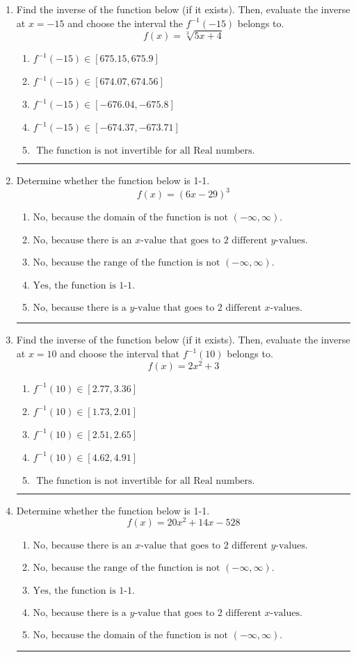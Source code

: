 \documentclass[14pt]{extbook}
\newcommand{\litem}[1]{\item#1\hspace*{-1cm}\rule{\textwidth}{0.4pt}}
\begin{document}
\begin{enumerate}
{\begin{enumerate}[label=\Alph*.]
\end{enumerate} }
\litem{
Find the inverse of the function below (if it exists). Then, evaluate the inverse at $x = -15$ and choose the interval the $f^{-1}(-15)$ belongs to.\[ f(x) = \sqrt[3]{5 x + 4} \]\begin{enumerate}[label=\Alph*.]
\item \( f^{-1}(-15) \in [675.15, 675.9] \)
\item \( f^{-1}(-15) \in [674.07, 674.56] \)
\item \( f^{-1}(-15) \in [-676.04, -675.8] \)
\item \( f^{-1}(-15) \in [-674.37, -673.71] \)
\item \( \text{ The function is not invertible for all Real numbers. } \)

\end{enumerate} }
\litem{
Determine whether the function below is 1-1.\[ f(x) = (6 x - 29)^3 \]\begin{enumerate}[label=\Alph*.]
\item \( \text{No, because the domain of the function is not $(-\infty, \infty)$.} \)
\item \( \text{No, because there is an $x$-value that goes to 2 different $y$-values.} \)
\item \( \text{No, because the range of the function is not $(-\infty, \infty)$.} \)
\item \( \text{Yes, the function is 1-1.} \)
\item \( \text{No, because there is a $y$-value that goes to 2 different $x$-values.} \)

\end{enumerate} }
\litem{
Find the inverse of the function below (if it exists). Then, evaluate the inverse at $x = 10$ and choose the interval that $f^{-1}(10)$ belongs to.\[ f(x) = 2 x^2 + 3 \]\begin{enumerate}[label=\Alph*.]
\item \( f^{-1}(10) \in [2.77, 3.36] \)
\item \( f^{-1}(10) \in [1.73, 2.01] \)
\item \( f^{-1}(10) \in [2.51, 2.65] \)
\item \( f^{-1}(10) \in [4.62, 4.91] \)
\item \( \text{ The function is not invertible for all Real numbers. } \)

\end{enumerate} }
\litem{
Determine whether the function below is 1-1.\[ f(x) = 20 x^2 + 14 x - 528 \]\begin{enumerate}[label=\Alph*.]
\item \( \text{No, because there is an $x$-value that goes to 2 different $y$-values.} \)
\item \( \text{No, because the range of the function is not $(-\infty, \infty)$.} \)
\item \( \text{Yes, the function is 1-1.} \)
\item \( \text{No, because there is a $y$-value that goes to 2 different $x$-values.} \)
\item \( \text{No, because the domain of the function is not $(-\infty, \infty)$.} \)


\end{enumerate}}
\end{enumerate}
\end{document}
